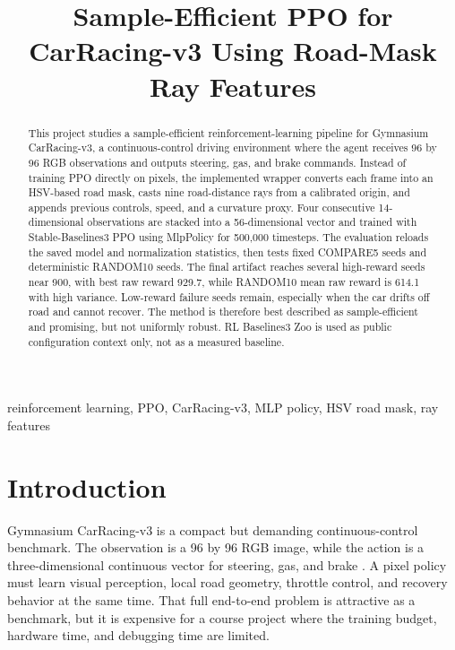 \documentclass[conference]{IEEEtran}
\begin{document}
\title{Sample-Efficient PPO for CarRacing-v3 Using Road-Mask Ray Features}

\author{
}

\maketitle

\begin{abstract}
This project studies a sample-efficient reinforcement-learning pipeline for Gymnasium CarRacing-v3, a continuous-control driving environment where the agent receives 96 by 96 RGB observations and outputs steering, gas, and brake commands. Instead of training PPO directly on pixels, the implemented wrapper converts each frame into an HSV-based road mask, casts nine road-distance rays from a calibrated origin, and appends previous controls, speed, and a curvature proxy. Four consecutive 14-dimensional observations are stacked into a 56-dimensional vector and trained with Stable-Baselines3 PPO using MlpPolicy for 500,000 timesteps. The evaluation reloads the saved model and normalization statistics, then tests fixed COMPARE5 seeds and deterministic RANDOM10 seeds. The final artifact reaches several high-reward seeds near 900, with best raw reward 929.7, while RANDOM10 mean raw reward is 614.1 with high variance. Low-reward failure seeds remain, especially when the car drifts off road and cannot recover. The method is therefore best described as sample-efficient and promising, but not uniformly robust. RL Baselines3 Zoo is used as public configuration context only, not as a measured baseline.
\end{abstract}

\begin{IEEEkeywords}
reinforcement learning, PPO, CarRacing-v3, MLP policy, HSV road mask, ray features
\end{IEEEkeywords}

\section{Introduction}

Gymnasium CarRacing-v3 is a compact but demanding continuous-control benchmark. The observation is a 96 by 96 RGB image, while the action is a three-dimensional continuous vector for steering, gas, and brake \cite{ref1}. A pixel policy must learn visual perception, local road geometry, throttle control, and recovery behavior at the same time. That full end-to-end problem is attractive as a benchmark, but it is expensive for a course project where the training budget, hardware time, and debugging time are limited.
\end{document}
